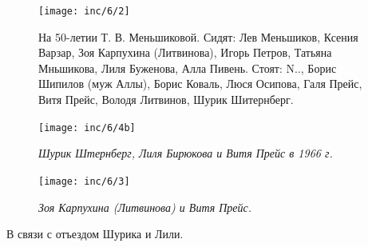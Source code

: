 \begin{figure}[ht]
    \texttt{[image: inc/6/2]}
    \caption{На 50-летии Т. В. Меньшиковой. Сидят: Лев Меньшиков, Ксения Варзар, Зоя Карпухина (Литвинова), Игорь Петров, Татьяна Мньшикова, Лиля Буженова, Алла Пивень. Стоят: N.., Борис Шипилов (муж Аллы), Борис Коваль, Люся Осипова, Галя Прейс, Витя Прейс, Володя Литвинов, Шурик Шитернберг.}
\end{figure}

\begin{figure}[h!]
    \noindent
    \begin{minipage}{65mm}
        \texttt{[image: inc/6/4b]} \begin{footnotesize}\textit{Шурик Штернберг, Лиля Бирюкова и Витя Прейс в 1966 г. }\end{footnotesize}
    \end{minipage}
    \hfill
    \begin{minipage}{55mm}
        \texttt{[image: inc/6/3]} \begin{footnotesize}\textit{Зоя Карпухина (Литвинова) и Витя Прейс.}\end{footnotesize}
    \end{minipage}
\end{figure}

\onehalfspacing

{\raggedleft В связи с отъездом Шурика и Лили.

}

